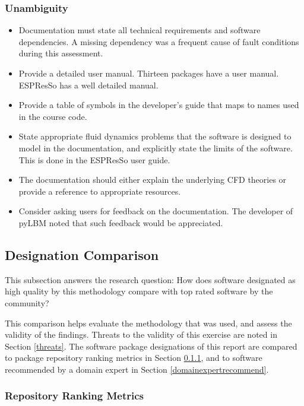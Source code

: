 \documentclass[12pt, notitlepage]{article}
\begin{document}
\subsubsection{Unambiguity}

\begin{itemize}
	\item Documentation must state all technical requirements and software dependencies. A missing dependency was a frequent cause of fault conditions during this assessment.
	\item Provide a detailed user manual. Thirteen packages have a user manual. ESPResSo has a well detailed manual.
	\item Provide a table of symbols in the developer's guide that maps to names used in the course code.
	\item State appropriate fluid dynamics problems that the software is designed to model in the documentation, and explicitly state the limits of the software. This is done in the ESPResSo user guide.
	\item The documentation should either explain the underlying CFD theories or provide a reference to appropriate resources.
	\item Consider asking users for feedback on the documentation. The developer of pyLBM noted that such feedback would be appreciated.
\end{itemize}


\subsection{Designation Comparison}\label{comparison}

This subsection answers the research question: How does software designated as high quality by this methodology compare with top rated software by the community?

This comparison helps evaluate the methodology that was used, and assess the validity of the findings. Threats to the validity of this exercise are noted in Section \ref{threats}. The software package designations of this report are compared to package repository ranking metrics in Section \ref{repmetrics}, and to software recommended by a domain expert in Section \ref{domainexpertrecommend}.

\subsubsection{Repository Ranking Metrics}\label{repmetrics}
\end{document}
